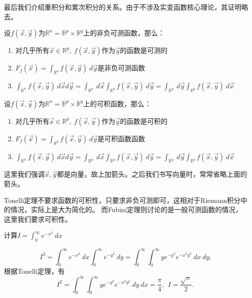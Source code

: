 \documentclass[color=green,thmcnt=section,lang=cn,12pt]{elegantbook}
\numberwithin{equation}{section}%
\numberwithin{figure}{section}%
\newcommand{\RR}{\mathbb{R}}
\renewcommand{\RN}{\RR^n}
\begin{document}
最后我们介绍重积分和累次积分的关系。由于不涉及实变函数核心理论，其证明略去。
\begin{theorem}[Tonelli]\label{tonellidingli}
    设$f(\vec{x},\vec{y})$为$\RN=\RR^p\times \RR^q$上的非负可测函数，那么：
    \begin{enumerate}[(1)]
        \item 对几乎所有$\vec{x}\in \RR^p,\ f(\vec{x},\vec{y})$作为$\vec{y}$的函数是可测的
        \item $F_f(\vec{x})=\int_{\RR^q}f(\vec{x},\vec{y})\ d\vec{y}$是非负可测函数
        \item $\int_{\RN}f(\vec{x},\vec{y})\ d\vec{x}d\vec{y}=\int_{\RR^p}\ d\vec{x}\int_{\RR^q}f(\vec{x},\vec{y})\ d\vec{y}=\int_{\RR^q}\ d\vec{y}\int_{\RR^q}f(\vec{x},\vec{y})\ d\vec{x}$
    \end{enumerate}
\end{theorem}

\begin{theorem}[Fubini]\label{fubinidingli}
    设$f(\vec{x},\vec{y})$为$\RN=\RR^p\times \RR^q$上的可积函数，那么：
    \begin{enumerate}[(1)]
        \item 对几乎所有$\vec{x}\in \RR^p,\ f(\vec{x},\vec{y})$作为$\vec{y}$的函数是可积的
        \item $F_f(\vec{x})=\int_{\RR^q}f(\vec{x},\vec{y})\ d\vec{y}$是可积函数函数
        \item $\int_{\RN}f(\vec{x},\vec{y})\ d\vec{x}d\vec{y}=\int_{\RR^p}\ d\vec{x}\int_{\RR^q}f(\vec{x},\vec{y})\ d\vec{y}=\int_{\RR^q}\ d\vec{y}\int_{\RR^q}f(\vec{x},\vec{y})\ d\vec{x}$
    \end{enumerate}
\end{theorem}
这里我们强调$\vec{x},\vec{y}$都是向量，故上加箭头。之后我们书写向量时，常常省略上面的箭头。


Tonelli定理不要求函数的可积性，只要求非负可测即可，这相对于Riemann积分中的情况，实际上是大为简化的。
而Fubini定理则讨论的是一般可测函数的情况，这里我们要求可积性。\\


\begin{example}
    计算$I=\int_{0}^{\infty}e^{-x^2}\ dx$
\end{example}
\begin{solution}
    \begin{equation*}
            I^2=\int_{0}^{\infty}e^{-x^2}\ dx\int_{0}^{\infty}e^{-y^2}\ dy=\int_{0}^{\infty}\int_{0}^{\infty}ye^{-y^2}e^{-x^2y^2}\ dx\ dy,
    \end{equation*}
    根据Tonelli定理，有
    \begin{equation*}
        I^2=\int_{0}^{\infty}\int_{0}^{\infty}ye^{-y^2}e^{-x^2y^2}\ dy\ dx=\frac{\pi}{4},\ \ I=\frac{\sqrt{\pi}}{2}.\ 
    \end{equation*}
\end{solution}
\ 
\end{document}
